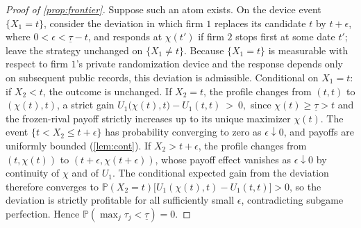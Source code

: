 \documentclass[12pt,reqno]{article}
\newcommand{\de}{\mathop{}\!\mathrm{d}}
\renewcommand{\Pr}{\mathbb{P}}
\theoremstyle{definition} \newtheorem{example}{Example}
\theoremstyle{definition} \newtheorem{condition}{Condition}
\theoremstyle{definition} \newtheorem{corollary}{Corollary}
\theoremstyle{definition} \newtheorem{claim}{Claim}
\theoremstyle{definition} \newtheorem{definition}{Definition}
\theoremstyle{definition} \newtheorem{conjecture}{Conjecture}
\theoremstyle{definition} \newtheorem{Lemma}{Lemma}
\theoremstyle{definition} \newtheorem{lemma}{Lemma}
\theoremstyle{plain} \newtheorem{theorem}{Theorem}
\theoremstyle{definition} \newtheorem{assumption}{Assumption}
\theoremstyle{definition} \newtheorem*{assumptionnonumber}{Assumption}
\theoremstyle{definition} \newtheorem*{theoremNoNumber}{Proposition}
\theoremstyle{definition}
\theoremstyle{definition}\newtheorem{proposition}{Proposition}
\theoremstyle{definition} \newtheorem{result}{Result}
\theoremstyle{definition} \newtheorem*{definitionNoNumber}{Definition}
\theoremstyle{definition} \newtheorem{Definition}{Definition}
\theoremstyle{definition} \newtheorem*{DefinitionNoNumber}{Definition}
\theoremstyle{definition} \newtheorem*{fact}{Fact}
\theoremstyle{definition} \newtheorem*{property}{Property}
\theoremstyle{definition} \newtheorem{remark}{Remark}
\begin{document}
\begin{proof}[Proof of \cref{prop:frontier}]
Suppose such an atom exists. On the device event $\{X_1=t\}$, consider the deviation in which firm $1$ replaces its candidate $t$ by $t+\epsilon$, where $0<\epsilon<\underline\tau-t$, and responds at $\chi(t')$ if firm $2$ stops first at some date $t'$; leave the strategy unchanged on $\{X_1\neq t\}$. Because $\{X_1=t\}$ is measurable with respect to firm $1$'s private randomization device and the response depends only on subsequent public records, this deviation is admissible. Conditional on $X_1=t$: if $X_2<t$, the outcome is unchanged. If $X_2=t$, the profile changes from $(t,t)$ to $(\chi(t),t)$, a strict gain
$
U_1\big(\chi(t),t\big)-U_1(t,t)\ >\ 0,$
since $\chi(t)\ge\underline\tau>t$ and the frozen-rival payoff strictly increases up to its unique maximizer $\chi(t)$. The event $\{t<X_2\le t+\epsilon\}$ has probability converging to zero as $\epsilon\downarrow0$, and payoffs are uniformly bounded (\cref{lem:cont}). If $X_2>t+\epsilon$, the profile changes from $(t,\chi(t))$ to $(t+\epsilon,\chi(t+\epsilon))$, whose payoff effect vanishes as $\epsilon\downarrow0$ by continuity of $\chi$ and of $U_1$. The conditional expected gain from the deviation therefore converges to
$\Pr(X_2=t)\big[U_1(\chi(t),t)-U_1(t,t)\big]>0$,
so the deviation is strictly profitable for all sufficiently small $\epsilon$, contradicting subgame perfection. Hence $\Pr(\max_j\tau_j<\underline\tau)=0$.

\end{proof}
\end{document}
